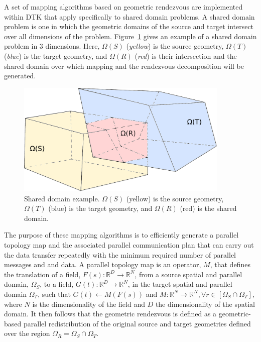 \documentclass{mc2013}
\begin{document}

A set of mapping algorithms based on geometric rendezvous are
implemented within DTK that apply specifically to shared domain
problems. A shared domain problem is one in which the geometric
domains of the source and target intersect over all dimensions of the
problem. Figure~\ref{fig:shared_domain} gives an example of a shared
domain problem in 3 dimensions. Here, $\Omega(S)$ ({\sl yellow}) is
the source geometry, $\Omega(T)$ ({\sl blue}) is the target geometry,
and $\Omega(R)$ ({\sl red}) is their intersection and the shared
domain over which mapping and the rendezvous decomposition will be
generated.
\begin{figure}[htpb!]
  \centering \includegraphics[width=4in]{overlapping_domain.pdf}
  \caption{Shared domain example. $\Omega(S)$ (yellow) is the source
    geometry, $\Omega(T)$ (blue) is the target geometry, and
    $\Omega(R)$ (red) is the shared domain.}
  \label{fig:shared_domain}
\end{figure}
The purpose of these mapping algorithms is to efficiently generate a
parallel topology map and the associated parallel communication plan
that can carry out the data transfer repeatedly with the minimum
required number of parallel messages and and data. A parallel topology
map is an operator, $M$, that defines the translation of a field,
$F(s): \mathbb{R}^D \rightarrow \mathbb{R}^N$, from a source spatial
and parallel domain, $\Omega_S$, to a field, $G(t): \mathbb{R}^D
\rightarrow \mathbb{R}^N$, in the target spatial and parallel domain
$\Omega_T$, such that $G(t)\leftarrow M(F(s))$ and $M: \mathbb{R}^N
\rightarrow \mathbb{R}^N, \forall r \in [\Omega_S \cap \Omega_T]$,
where $N$ is the dimensionality of the field and $D$ the
dimensionality of the spatial domain. It then follows that the
geometric rendezvous is defined as a geometric-based parallel
redistribution of the original source and target geometries defined
over the region $\Omega_R = \Omega_S \cap \Omega_T$.
\end{document}
